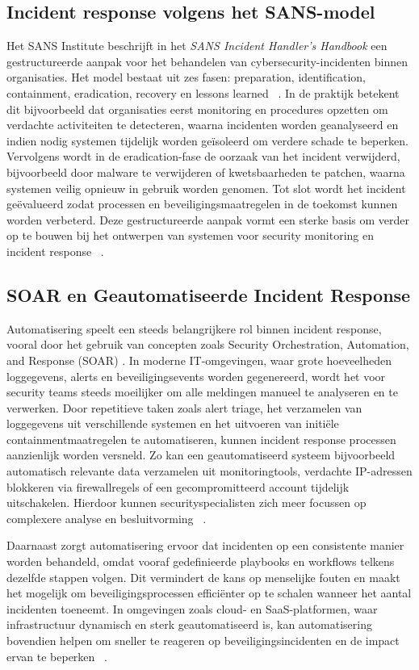 \subsection{Incident response volgens het SANS-model}
Het SANS Institute beschrijft in het \textit{SANS Incident Handler’s Handbook} een gestructureerde aanpak voor het behandelen van cybersecurity-incidenten binnen organisaties. Het model bestaat uit zes fasen: preparation, identification, containment, eradication, recovery en lessons learned ~\autocite{kral2012}. In de praktijk betekent dit bijvoorbeeld dat organisaties eerst monitoring en procedures opzetten om verdachte activiteiten te detecteren, waarna incidenten worden geanalyseerd en indien nodig systemen tijdelijk worden geïsoleerd om verdere schade te beperken. Vervolgens wordt in de eradication-fase de oorzaak van het incident verwijderd, bijvoorbeeld door malware te verwijderen of kwetsbaarheden te patchen, waarna systemen veilig opnieuw in gebruik worden genomen. Tot slot wordt het incident geëvalueerd zodat processen en beveiligingsmaatregelen in de toekomst kunnen worden verbeterd. Deze gestructureerde aanpak vormt een sterke basis om verder op te bouwen bij het ontwerpen van systemen voor security monitoring en incident response ~\autocite{kral2012}.

\subsection{SOAR en Geautomatiseerde Incident Response}
Automatisering speelt een steeds belangrijkere rol binnen incident response, vooral door het gebruik van concepten zoals Security Orchestration, Automation, and Response (SOAR) \autocite{s21144759}. In moderne IT-omgevingen, waar grote hoeveelheden loggegevens, alerts en beveiligingsevents worden gegenereerd, wordt het voor security teams steeds moeilijker om alle meldingen manueel te analyseren en te verwerken. Door repetitieve taken zoals alert triage, het verzamelen van loggegevens uit verschillende systemen en het uitvoeren van initiële containmentmaatregelen te automatiseren, kunnen incident response processen aanzienlijk worden versneld. Zo kan een geautomatiseerd systeem bijvoorbeeld automatisch relevante data verzamelen uit monitoringtools, verdachte IP-adressen blokkeren via firewallregels of een gecompromitteerd account tijdelijk uitschakelen. Hierdoor kunnen securityspecialisten zich meer focussen op complexere analyse en besluitvorming ~\autocite{s21144759}. 

Daarnaast zorgt automatisering ervoor dat incidenten op een consistente manier worden behandeld, omdat vooraf gedefinieerde playbooks en workflows telkens dezelfde stappen volgen. Dit vermindert de kans op menselijke fouten en maakt het mogelijk om beveiligingsprocessen efficiënter op te schalen wanneer het aantal incidenten toeneemt. In omgevingen zoals cloud- en SaaS-platformen, waar infrastructuur dynamisch en sterk geautomatiseerd is, kan automatisering bovendien helpen om sneller te reageren op beveiligingsincidenten en de impact ervan te beperken ~\autocite{s21144759}.


